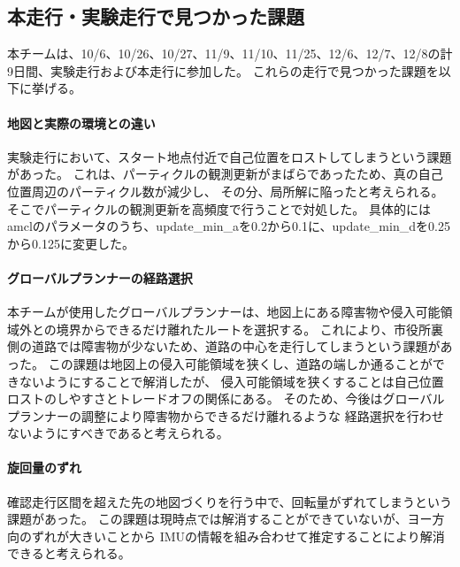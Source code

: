 \documentclass[twocolumn,9pt]{jsproceedings}
\begin{document}
\subsection{本走行・実験走行で見つかった課題}

本チームは、10/6、10/26、10/27、11/9、11/10、11/25、12/6、12/7、12/8の計9日間、実験走行および本走行に参加した。
これらの走行で見つかった課題を以下に挙げる。
\paragraph{地図と実際の環境との違い}
実験走行において、スタート地点付近で自己位置をロストしてしまうという課題があった。
これは、パーティクルの観測更新がまばらであったため、真の自己位置周辺のパーティクル数が減少し、
その分、局所解に陥ったと考えられる。
そこでパーティクルの観測更新を高頻度で行うことで対処した。
具体的にはamclのパラメータのうち、update\_min\_aを0.2から0.1に、update\_min\_dを0.25から0.125に変更した。

\paragraph{グローバルプランナーの経路選択}
本チームが使用したグローバルプランナーは、地図上にある障害物や侵入可能領域外との境界からできるだけ離れたルートを選択する。
これにより、市役所裏側の道路では障害物が少ないため、道路の中心を走行してしまうという課題があった。
この課題は地図上の侵入可能領域を狭くし、道路の端しか通ることができないようにすることで解消したが、
侵入可能領域を狭くすることは自己位置ロストのしやすさとトレードオフの関係にある。
そのため、今後はグローバルプランナーの調整により障害物からできるだけ離れるような
経路選択を行わせないようにすべきであると考えられる。

\paragraph{旋回量のずれ}
確認走行区間を超えた先の地図づくりを行う中で、回転量がずれてしまうという課題があった。
この課題は現時点では解消することができていないが、ヨー方向のずれが大きいことから
IMUの情報を組み合わせて推定することにより解消できると考えられる。
\end{document}
